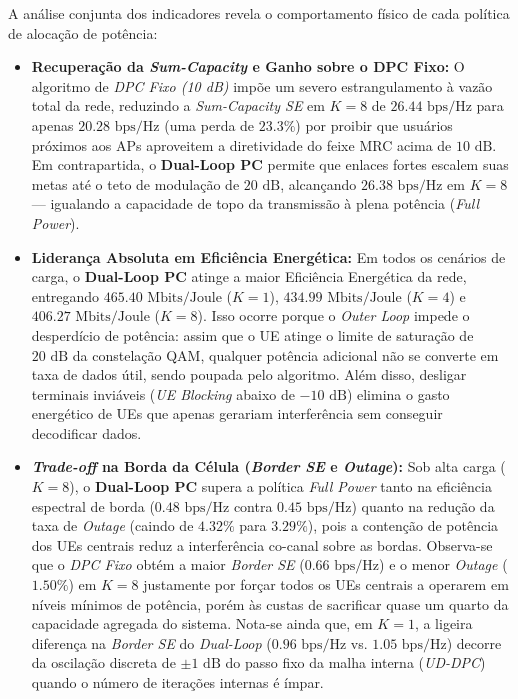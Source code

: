 A análise conjunta dos indicadores revela o comportamento físico de cada política de alocação de potência:

\begin{itemize}
    \item \textbf{Recuperação da \textit{Sum-Capacity} e Ganho sobre o DPC Fixo:} O algoritmo de \textit{DPC Fixo (10 dB)} impõe um severo estrangulamento à vazão total da rede, reduzindo a \textit{Sum-Capacity SE} em $K=8$ de $26.44\text{ bps/Hz}$ para apenas $20.28\text{ bps/Hz}$ (uma perda de $23.3\%$) por proibir que usuários próximos aos APs aproveitem a diretividade do feixe MRC acima de $10\text{ dB}$. Em contrapartida, o \textbf{Dual-Loop PC} permite que enlaces fortes escalem suas metas até o teto de modulação de $20\text{ dB}$, alcançando $26.38\text{ bps/Hz}$ em $K=8$ — igualando a capacidade de topo da transmissão à plena potência (\textit{Full Power}).
    \item \textbf{Liderança Absoluta em Eficiência Energética:} Em todos os cenários de carga, o \textbf{Dual-Loop PC} atinge a maior Eficiência Energética da rede, entregando $465.40\text{ Mbits/Joule}$ ($K=1$), $434.99\text{ Mbits/Joule}$ ($K=4$) e $406.27\text{ Mbits/Joule}$ ($K=8$). Isso ocorre porque o \textit{Outer Loop} impede o desperdício de potência: assim que o UE atinge o limite de saturação de $20\text{ dB}$ da constelação QAM, qualquer potência adicional não se converte em taxa de dados útil, sendo poupada pelo algoritmo. Além disso, desligar terminais inviáveis (\textit{UE Blocking} abaixo de $-10\text{ dB}$) elimina o gasto energético de UEs que apenas gerariam interferência sem conseguir decodificar dados.
    \item \textbf{\textit{Trade-off} na Borda da Célula (\textit{Border SE} e \textit{Outage}):} Sob alta carga ($K=8$), o \textbf{Dual-Loop PC} supera a política \textit{Full Power} tanto na eficiência espectral de borda ($0.48\text{ bps/Hz}$ contra $0.45\text{ bps/Hz}$) quanto na redução da taxa de \textit{Outage} (caindo de $4.32\%$ para $3.29\%$), pois a contenção de potência dos UEs centrais reduz a interferência co-canal sobre as bordas. Observa-se que o \textit{DPC Fixo} obtém a maior \textit{Border SE} ($0.66\text{ bps/Hz}$) e o menor \textit{Outage} ($1.50\%$) em $K=8$ justamente por forçar todos os UEs centrais a operarem em níveis mínimos de potência, porém às custas de sacrificar quase um quarto da capacidade agregada do sistema. Nota-se ainda que, em $K=1$, a ligeira diferença na \textit{Border SE} do \textit{Dual-Loop} ($0.96\text{ bps/Hz}$ vs. $1.05\text{ bps/Hz}$) decorre da oscilação discreta de $\pm 1\text{ dB}$ do passo fixo da malha interna (\textit{UD-DPC}) quando o número de iterações internas é ímpar.
\end{itemize}

